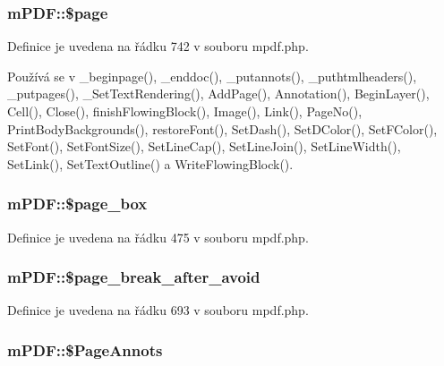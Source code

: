 \hypertarget{classm_p_d_f_a99da7fd280cc0e8ade374d3522eb9d8c}{
\subsubsection[{\$page}]{\setlength{\rightskip}{0pt plus 5cm}m\-P\-D\-F\-::\$page}}\label{classm_p_d_f_a99da7fd280cc0e8ade374d3522eb9d8c}


Definice je uvedena na řádku 742 v souboru mpdf.\-php.



Používá se v \-\_\-beginpage(), \-\_\-enddoc(), \-\_\-putannots(), \-\_\-puthtmlheaders(), \-\_\-putpages(), \-\_\-\-Set\-Text\-Rendering(), Add\-Page(), Annotation(), Begin\-Layer(), Cell(), Close(), finish\-Flowing\-Block(), Image(), Link(), Page\-No(), Print\-Body\-Backgrounds(), restore\-Font(), Set\-Dash(), Set\-D\-Color(), Set\-F\-Color(), Set\-Font(), Set\-Font\-Size(), Set\-Line\-Cap(), Set\-Line\-Join(), Set\-Line\-Width(), Set\-Link(), Set\-Text\-Outline() a Write\-Flowing\-Block().

\hypertarget{classm_p_d_f_a3aa82a5bd7ad2c9087458a2ffb10ffcf}{
\subsubsection[{\$page\-\_\-box}]{\setlength{\rightskip}{0pt plus 5cm}m\-P\-D\-F\-::\$page\-\_\-box}}\label{classm_p_d_f_a3aa82a5bd7ad2c9087458a2ffb10ffcf}


Definice je uvedena na řádku 475 v souboru mpdf.\-php.

\hypertarget{classm_p_d_f_a974bc094f6f697ae491cc283eee42cea}{
\subsubsection[{\$page\-\_\-break\-\_\-after\-\_\-avoid}]{\setlength{\rightskip}{0pt plus 5cm}m\-P\-D\-F\-::\$page\-\_\-break\-\_\-after\-\_\-avoid}}\label{classm_p_d_f_a974bc094f6f697ae491cc283eee42cea}


Definice je uvedena na řádku 693 v souboru mpdf.\-php.

\hypertarget{classm_p_d_f_ab1bcd26f48a33def54ecffb22cc2892e}{
\subsubsection[{\$\-Page\-Annots}]{\setlength{\rightskip}{0pt plus 5cm}m\-P\-D\-F\-::\$\-Page\-Annots}}\label{classm_p_d_f_ab1bcd26f48a33def54ecffb22cc2892e}


